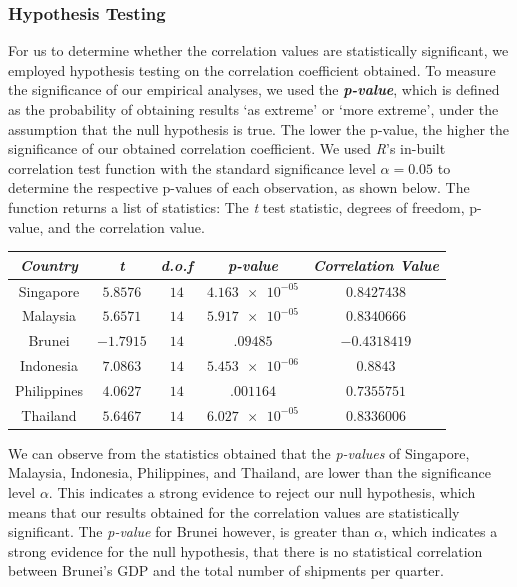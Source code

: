 \documentclass{article}
\begin{document}
\subsubsection{Hypothesis Testing} \label{HypoTest}
For us to determine whether the correlation values are statistically significant, we employed hypothesis testing on the correlation coefficient obtained. To measure the significance of our empirical analyses, we used the \textbf{\textit{p-value}}, which is defined as the probability of obtaining results ‘as extreme’ or ‘more extreme’, under the assumption that the null hypothesis is true. The lower the p-value, the higher the significance of our obtained correlation coefficient. We used \textit{R}'s in-built correlation test function with the standard significance level $\alpha = 0.05$ to determine the respective p-values of each observation, as shown below. The function returns a list of statistics: The \textit{t} test statistic, degrees of freedom, p-value, and the correlation value. 

\begin{center}
    \begin{tabular}{ |c|c|c|c|c| } 
     \hline
        \textit{\textbf{Country}} & \textit{\textbf{t}} & \textit{\textbf{d.o.f}} & \textit{\textbf{p-value}} & \textit{\textbf{Correlation Value}} \\
        \hline
        Singapore & $5.8576$ & $14$ & $\num{4.163e-05}$ & $0.8427438$  \\
        \hline
        Malaysia & $5.6571$ & $14$ & $\num{5.917e-05}$ & $0.8340666$ \\
        \hline
        Brunei & $-1.7915$ & $14$ & $\num{.09485}$ & $-0.4318419$  \\
        \hline
        Indonesia & $7.0863$ & $14$ & $\num{5.453e-06}$ & $0.8843$  \\
        \hline
        Philippines & $4.0627$ & $14$ & $\num{.001164}$ & $0.7355751$  \\
        \hline
        Thailand & $5.6467$ & $14$ & $\num{6.027e-05}$ & $0.8336006$  \\
        \hline
    \end{tabular}
\end{center} 

\noindent We can observe from the statistics obtained that the \textit{p-values} of Singapore, Malaysia, Indonesia, Philippines, and Thailand, are lower than the significance level $\alpha$. This indicates a strong evidence to reject our null hypothesis, which means that our results obtained for the correlation values are statistically significant. The \textit{p-value} for Brunei however, is greater than $\alpha$, which indicates a strong evidence for the null hypothesis, that there is no statistical correlation between Brunei's GDP and the total number of shipments per quarter. \\
\end{document}

